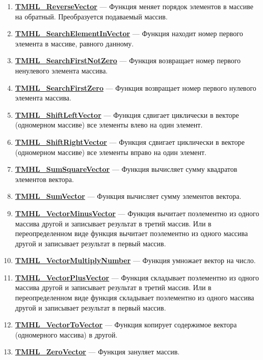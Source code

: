 \documentclass[a4paper,12pt]{article}
\begin{document}
\begin{enumerate}
\item \textbf{\hyperref[TMHL_ReverseVector]{TMHL\_ReverseVector}} --- Функция меняет порядок элементов в массиве на обратный. Преобразуется подаваемый массив.

\item \textbf{\hyperref[TMHL_SearchElementInVector]{TMHL\_SearchElementInVector}} --- Функция находит номер первого элемента в массиве, равного данному.

\item \textbf{\hyperref[TMHL_SearchFirstNotZero]{TMHL\_SearchFirstNotZero}} --- Функция возвращает номер первого ненулевого элемента массива.

\item \textbf{\hyperref[TMHL_SearchFirstZero]{TMHL\_SearchFirstZero}} --- Функция возвращает номер первого нулевого элемента массива.

\item \textbf{\hyperref[TMHL_ShiftLeftVector]{TMHL\_ShiftLeftVector}} --- Функция сдвигает циклически в векторе (одномерном массиве) все элементы влево на один элемент.

\item \textbf{\hyperref[TMHL_ShiftRightVector]{TMHL\_ShiftRightVector}} --- Функция сдвигает циклически в векторе (одномерном массиве) все элементы вправо на один элемент.

\item \textbf{\hyperref[TMHL_SumSquareVector]{TMHL\_SumSquareVector}} --- Функция вычисляет сумму квадратов элементов вектора.

\item \textbf{\hyperref[TMHL_SumVector]{TMHL\_SumVector}} --- Функция вычисляет сумму элементов вектора.

\item \textbf{\hyperref[TMHL_VectorMinusVector]{TMHL\_VectorMinusVector}} --- Функция вычитает поэлементно из одного массива другой и записывает результат в третий массив. Или в переопределенном виде функция вычитает поэлементно из одного массива другой и записывает результат в первый массив.

\item \textbf{\hyperref[TMHL_VectorMultiplyNumber]{TMHL\_VectorMultiplyNumber}} --- Функция умножает вектор на число.

\item \textbf{\hyperref[TMHL_VectorPlusVector]{TMHL\_VectorPlusVector}} --- Функция складывает поэлементно из одного массива другой и записывает результат в третий массив. Или в переопределенном виде функция складывает поэлементно из одного массива другой и записывает результат в первый массив.

\item \textbf{\hyperref[TMHL_VectorToVector]{TMHL\_VectorToVector}} --- Функция копирует содержимое вектора (одномерного массива) в другой.

\item \textbf{\hyperref[TMHL_ZeroVector]{TMHL\_ZeroVector}} --- Функция зануляет массив.

\end{enumerate}
\end{document}
